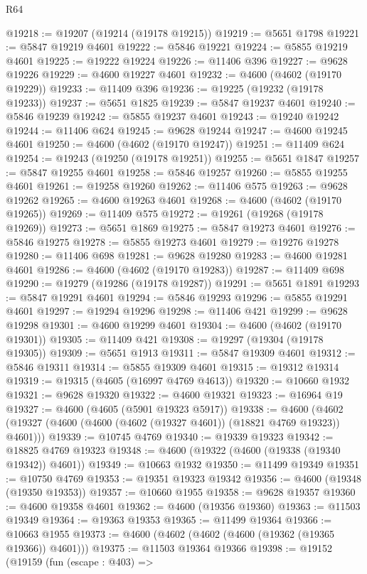 \begin{lexlean}{R64}
\begin{coremodule}
@19218 := @19207 (@19214 (@19178 @19215))
@19219 := @5651 @1798
@19221 := @5847 @19219 @4601
@19222 := @5846 @19221
@19224 := @5855 @19219 @4601
@19225 := @19222 @19224
@19226 := @11406 @396
@19227 := @9628 @19226
@19229 := @4600 @19227 @4601
@19232 := @4600 (@4602 (@19170 @19229))
@19233 := @11409 @396
@19236 := @19225 (@19232 (@19178 @19233))
@19237 := @5651 @1825
@19239 := @5847 @19237 @4601
@19240 := @5846 @19239
@19242 := @5855 @19237 @4601
@19243 := @19240 @19242
@19244 := @11406 @624
@19245 := @9628 @19244
@19247 := @4600 @19245 @4601
@19250 := @4600 (@4602 (@19170 @19247))
@19251 := @11409 @624
@19254 := @19243 (@19250 (@19178 @19251))
@19255 := @5651 @1847
@19257 := @5847 @19255 @4601
@19258 := @5846 @19257
@19260 := @5855 @19255 @4601
@19261 := @19258 @19260
@19262 := @11406 @575
@19263 := @9628 @19262
@19265 := @4600 @19263 @4601
@19268 := @4600 (@4602 (@19170 @19265))
@19269 := @11409 @575
@19272 := @19261 (@19268 (@19178 @19269))
@19273 := @5651 @1869
@19275 := @5847 @19273 @4601
@19276 := @5846 @19275
@19278 := @5855 @19273 @4601
@19279 := @19276 @19278
@19280 := @11406 @698
@19281 := @9628 @19280
@19283 := @4600 @19281 @4601
@19286 := @4600 (@4602 (@19170 @19283))
@19287 := @11409 @698
@19290 := @19279 (@19286 (@19178 @19287))
@19291 := @5651 @1891
@19293 := @5847 @19291 @4601
@19294 := @5846 @19293
@19296 := @5855 @19291 @4601
@19297 := @19294 @19296
@19298 := @11406 @421
@19299 := @9628 @19298
@19301 := @4600 @19299 @4601
@19304 := @4600 (@4602 (@19170 @19301))
@19305 := @11409 @421
@19308 := @19297 (@19304 (@19178 @19305))
@19309 := @5651 @1913
@19311 := @5847 @19309 @4601
@19312 := @5846 @19311
@19314 := @5855 @19309 @4601
@19315 := @19312 @19314
@19319 := @19315 (@4605 (@16997 @4769 @4613))
@19320 := @10660 @1932
@19321 := @9628 @19320
@19322 := @4600 @19321
@19323 := @16964 @19
@19327 := @4600 (@4605 (@5901 @19323 @5917))
@19338 := @4600 (@4602 (@19327 (@4600 (@4600 (@4602 (@19327 @4601)) (@18821 @4769 @19323)) @4601)))
@19339 := @10745 @4769
@19340 := @19339 @19323
@19342 := @18825 @4769 @19323
@19348 := @4600 (@19322 (@4600 (@19338 (@19340 @19342)) @4601))
@19349 := @10663 @1932
@19350 := @11499 @19349
@19351 := @10750 @4769
@19353 := @19351 @19323 @19342
@19356 := @4600 (@19348 (@19350 @19353))
@19357 := @10660 @1955
@19358 := @9628 @19357
@19360 := @4600 @19358 @4601
@19362 := @4600 (@19356 @19360)
@19363 := @11503 @19349
@19364 := @19363 @19353
@19365 := @11499 @19364
@19366 := @10663 @1955
@19373 := @4600 (@4602 (@4602 (@4600 (@19362 (@19365 @19366)) @4601)))
@19375 := @11503 @19364 @19366
@19398 := @19152
    (@19159
      (fun (escape : @403) =>

\end{coremodule}
\end{lexlean}

